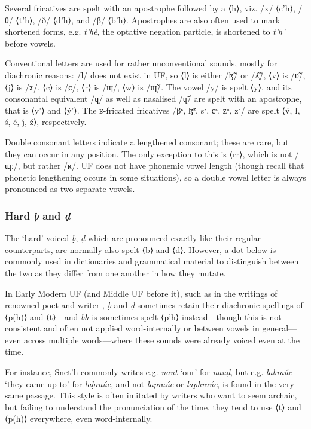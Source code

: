 \documentclass[a4paper, 12pt, twoside, final]{article}
\let \w \textit
\begin{document}
Several fricatives are spelt with an apostrophe followed by a ⟨h⟩, viz. /x/ ⟨c’h⟩, /θ/ ⟨t’h⟩, /ð/ ⟨d’h⟩,
and /β/ ⟨b’h⟩. Apostrophes are also often used to mark shortened forms, e.g. \w{t’hé},
the optative negation particle, is shortened to \w{t’h’} before vowels.

Conventional letters are used for rather unconventional sounds, mostly for diachronic reasons:
/l/ does not exist in UF, so ⟨l⟩ is either /ɮ̃/ or /ʎ̝̃/, ⟨v⟩ is /ʋ̃/, ⟨j⟩ is /ʑ/, ⟨c⟩ is /ɕ/, ⟨r⟩ is /ɰ/, ⟨w⟩ is /ɰ̃/. The vowel
/y/ is spelt ⟨y⟩, and its consonantal equivalent /ɥ/ as well as nasalised /ɥ̃/ are spelt with an apostrophe, that is
⟨y’⟩ and ⟨ý’⟩. The ʁ-fricated fricatives /βʶ, ɮ̃ʶ, sʶ, ɕʶ, ʑʶ, zʶ/
are spelt ⟨v́, ł, ś, ć, ȷ́, ź⟩, respectively.

Double consonant letters indicate a lengthened consonant; these are rare, but they can occur in any position. The only
exception to this is ⟨rr⟩, which is not /ɰː/, but rather /ʀ/. UF does not have phonemic vowel length (though recall
that phonetic lengthening occurs in some situations), so a double vowel letter is always pronounced as two separate vowels.

\subsubsection{Hard \textit{ḅ} and \textit{ḍ}}
The ‘hard’ voiced \w{ḅ}, \w{ḍ} which are pronounced exactly like their regular counterparts, are normally also spelt ⟨b⟩ and
⟨d⟩. However, a dot below is commonly used in dictionaries and grammatical material to distinguish between the two
as they differ from one another in how they mutate.

In Early Modern UF (and Middle UF before it), such as in the writings of renowned poet and writer , \w{ḅ} and \w{ḍ} sometimes retain their diachronic spellings of ⟨p(h)⟩ and ⟨t⟩—and \w{bh} is sometimes spelt
⟨p’h⟩ instead—though this is not consistent and often not applied word-internally or between vowels in general—even across multiple
words—where these sounds were already voiced even at the time.

For instance, Snet’h commonly writes e.g. \w{naut} ‘our’ for \w{nauḍ}, but e.g. \w{labraúc} ‘they came up to’ for \w{laḅraúc}, and not
\w{lapraúc} or \w{laphraúc}, is found in the very same passage. This style is often imitated by writers who want to seem archaic, but failing to
understand the pronunciation of the time, they tend to use ⟨t⟩ and ⟨p(h)⟩ everywhere, even word-internally.
\end{document}
